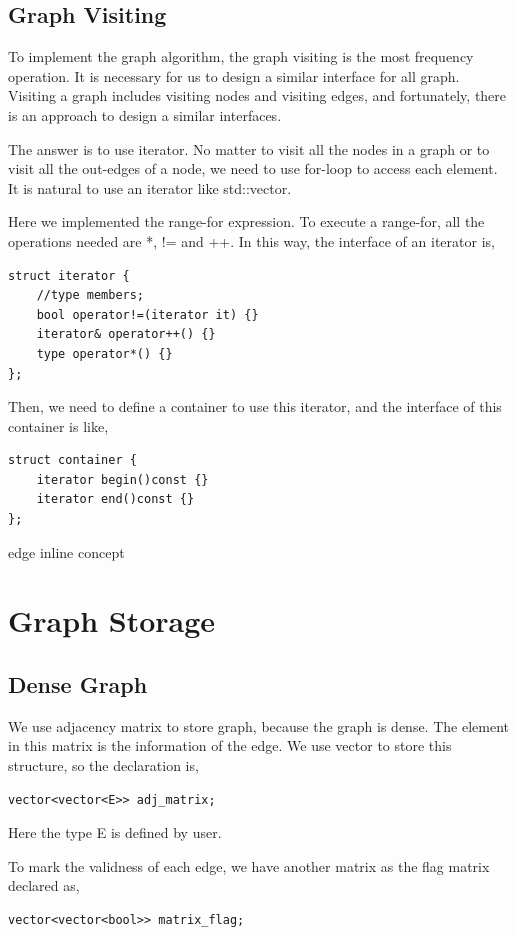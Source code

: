 \documentclass[]{article}
\begin{document}
\subsection{Graph Visiting}
To implement the graph algorithm, the graph visiting is the most frequency operation. It is necessary for us to design a similar interface for all graph. Visiting a graph includes visiting nodes and visiting edges, and fortunately, there is an approach to design a similar interfaces. 

The answer is to use iterator. No matter to visit all the nodes in a graph or to visit all the out-edges of a node, we need to use for-loop to access each element. It is natural to use an iterator like std::vector. 

Here we implemented the range-for expression. To execute a range-for, all the operations needed are *, != and ++.  In this way, the interface of an iterator is,
\begin{lstlisting}
struct iterator {
	//type members;
	bool operator!=(iterator it) {}
	iterator& operator++() {}
	type operator*() {}
};
\end{lstlisting}
Then, we need to define a container to use this iterator, and the interface of this container is like,
\begin{lstlisting}
struct container {
	iterator begin()const {}
	iterator end()const {}
};
\end{lstlisting}
edge inline
concept
\section{Graph Storage}
\subsection{Dense Graph}
We use adjacency matrix to store graph, because the graph is dense. The element in this matrix is the information of the edge. We use vector to store this structure, so the declaration is,

\begin{lstlisting}
vector<vector<E>> adj_matrix;

\end{lstlisting} 
Here the type E is defined by user. 

To mark the validness of each edge, we have another matrix as the flag matrix declared as,
\begin{lstlisting}
vector<vector<bool>> matrix_flag;
\end{lstlisting}
\end{document}
